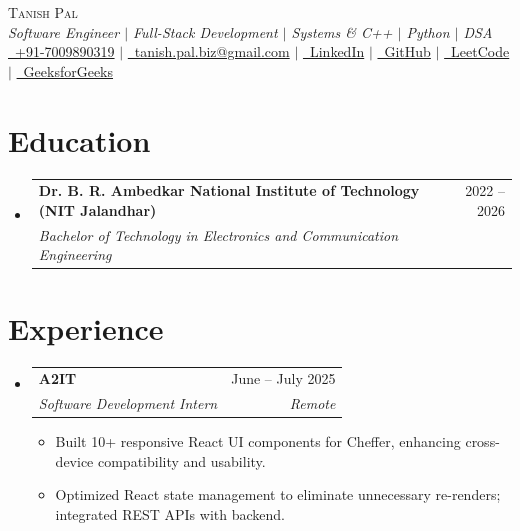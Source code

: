 \documentclass[letterpaper,10pt]{article}
\makeatletter
\newcommand{\resumeItem}[1]{
  \item\small{#1 \vspace{-1.5pt}}
}
\newcommand{\resumeSubheading}[4]{
  \vspace{-1pt}\item
    \begin{tabular*}{0.98\textwidth}[t]{l@{\extracolsep{\fill}}r}
      \textbf{#1} & #2 \\
      \textit{\small#3} & \textit{\small #4} \\
    \end{tabular*}\vspace{-6pt}
}
\newcommand{\resumeSubHeadingListStart}{\begin{itemize}[leftmargin=0.12in, label={}, itemsep=1.5pt, parsep=0pt, topsep=1pt, partopsep=0pt]}
\newcommand{\resumeSubHeadingListEnd}{\end{itemize}\vspace{-4pt}}
\newcommand{\resumeItemListStart}{\begin{itemize}[leftmargin=0.18in, itemsep=1pt, parsep=0pt, topsep=1pt, partopsep=0pt]}
\newcommand{\resumeItemListEnd}{\end{itemize}\vspace{-3.5pt}}
\makeatother
\begin{document}
\begin{center}
    {\LARGE \scshape Tanish Pal} \\ \vspace{1.5pt}
    {\small \textit{Software Engineer $|$ Full-Stack Development $|$ Systems \& C++ $|$ Python $|$ DSA}} \\ \vspace{2.5pt}
    \footnotesize
    \href{tel:+917009890319}{\faPhone\ +91-7009890319} \hspace{0.4em}$|$\hspace{0.4em}
    \href{mailto:tanish.pal.biz@gmail.com}{\faEnvelope\ tanish.pal.biz@gmail.com} \hspace{0.4em}$|$\hspace{0.4em}
    \href{https://shorturl.at/V8bXN}{\faLinkedin\ LinkedIn} \hspace{0.4em}$|$\hspace{0.4em}
    \href{https://github.com/Tanishpal23}{\faGithub\ GitHub} \hspace{0.4em}$|$\hspace{0.4em}
    \href{https://leetcode.com/u/Tech_tonic/}{\faCode\ LeetCode} \hspace{0.4em}$|$\hspace{0.4em}
    \href{https://www.geeksforgeeks.org/profile/tanishhh22xz1}{\faCodeBranch\ GeeksforGeeks}
\end{center}
\vspace{-8pt}

\section{Education}
  \resumeSubHeadingListStart
    \resumeSubheading
      {Dr. B. R. Ambedkar National Institute of Technology (NIT Jalandhar)}{2022 -- 2026}
      {Bachelor of Technology in Electronics and Communication Engineering}{}
  \resumeSubHeadingListEnd

\section{Experience}
  \resumeSubHeadingListStart
    \resumeSubheading
      {A2IT}{June -- July 2025}
      {Software Development Intern}{Remote}
      \resumeItemListStart
        \resumeItem{Built 10+ responsive React UI components for Cheffer, enhancing cross-device compatibility and usability.}
        \resumeItem{Optimized React state management to eliminate unnecessary re-renders; integrated REST APIs with backend.}
      \resumeItemListEnd
  \resumeSubHeadingListEnd
\end{document}
